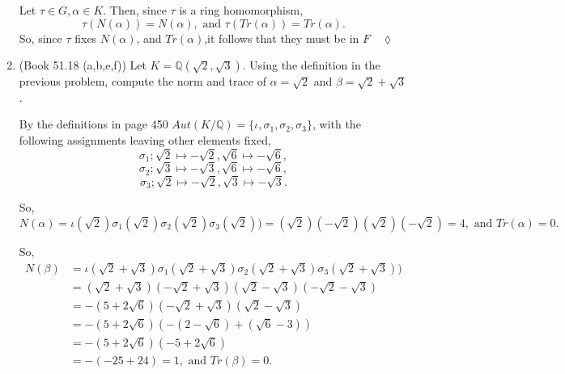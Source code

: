 \documentclass{article}
\newcommand\Q{\mathbb{Q}}
\begin{document}
\begin{enumerate}

Let $\tau \in G,\alpha \in K$. Then, since $\tau$ is a ring
homomorphism,
\[\tau(N(\alpha)) = N(\alpha),\text{ and } \tau(Tr(\alpha)) =
  Tr(\alpha).\]
So, since $\tau$ fixes $N(\alpha)$, and $Tr(\alpha)$,it follows that
they must be in $F\quad\lozenge$

\item (Book 51.18 (a,b,e,f)) Let $K = \Q(\sqrt 2, \sqrt 3)$. Using the definition in the previous problem, compute the norm and trace of $\alpha = \sqrt 2$ and $\beta = \sqrt 2 + \sqrt 3$.


  By the definitions in page 450 $Aut(K/\Q) =
  \{\iota,\sigma_1,\sigma_2,\sigma_3\}$, with the following
  assignments leaving other elements fixed,
  \[\sigma_1; \sqrt{2} \mapsto -\sqrt{2},\sqrt{6}\mapsto -\sqrt{6}, \]
  \[\sigma_2; \sqrt{3} \mapsto -\sqrt{3},\sqrt{6}\mapsto -\sqrt{6}, \]
  \[\sigma_3; \sqrt{2} \mapsto -\sqrt{2},\sqrt{3}\mapsto -\sqrt{3}. \]

  So, \[N(\alpha) =
  \iota(\sqrt{2})\sigma_1(\sqrt{2})\sigma_2(\sqrt{2})\sigma_3(\sqrt{2}))
  = (\sqrt{2})(-\sqrt{2})(\sqrt{2})(-\sqrt{2}) = 4,\text{ and
  }Tr(\alpha) = 0.\]

So, \begin{align*} N(\beta) &=
  \iota(\sqrt{2}+\sqrt{3})\sigma_1(\sqrt{2}+\sqrt{3})\sigma_2(\sqrt{2}+\sqrt{3})\sigma_3(\sqrt{2}+\sqrt{3}))\\
  &=
    (\sqrt{2}+\sqrt{3})(-\sqrt{2}+\sqrt{3})(\sqrt{2}-\sqrt{3})(-\sqrt{2}-\sqrt{3})\\
                            &= -(5+2\sqrt{6})(-\sqrt{2}+\sqrt{3})(\sqrt{2}-\sqrt{3})\\
                            &=
                              -(5+2\sqrt{6})(-(2-\sqrt{6})+(\sqrt{6}-3))\\
                            &= -(5+2\sqrt{6})(-5 +2\sqrt{6})\\
                            &= -(-25+24) = 1, \text{ and } Tr(\beta) = 0.
    \end{align*}

\end{enumerate}
\end{document}
